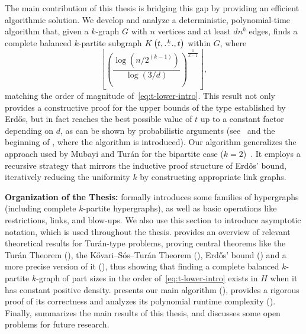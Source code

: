 The main contribution of this thesis is bridging this gap by providing an efficient algorithmic solution.
We develop and analyze a deterministic, polynomial-time algorithm that,
given a $k$-graph $G$ with $n$ vertices and at least $dn^k$ edges,
finds a complete balanced $k$-partite subgraph $K\left(t, \overset{k}{\dots}, t\right)$ within $G$, where
\[
    \left\lfloor \left(  \frac{\log \left(n/2^{(k-1)}\right)}{\log (3/d)} \right)^{\frac{1}{k-1}} \right\rfloor,
\]
matching the order of magnitude of~\eqref{eq:t-lower-intro}.
This result not only provides a constructive proof for the upper bounds of the type established by Erdős,
but in fact reaches the best possible value of $t$ up to a constant factor depending on $d$, as
can be shown by probabilistic arguments (see~ and
the beginning of , where the algorithm is introduced).
Our algorithm generalizes the approach used by Mubayi and Turán for the bipartite case ($k=2$)~\cite{MUBAYI2010174}.
It employs a recursive strategy that mirrors the inductive proof structure of Erdős' bound,
iteratively reducing the uniformity $k$ by constructing appropriate link graphs.

\textbf{Organization of the Thesis:}
 formally introduces some families of hypergraphs
(including complete $k$-partite hypergraphs),
as well as basic operations like restrictions, links, and blow-ups.
We also use this section to introduce asymptotic notation, which is used throughout the thesis.
 provides an overview of relevant theoretical results for Turán-type problems,
proving central theorems like the Turán Theorem (), the Kővari--Sós--Turán Theorem (),
Erdős' bound () and a more precise version of it (),
thus showing that finding a complete balanced $k$-partite $k$-graph of part sizes in the order of~\eqref{eq:t-lower-intro}
exists in $H$ when it has constant positive density.
 presents our main algorithm (),
provides a rigorous proof of its correctness and analyzes its polynomial runtime complexity ().
Finally,  summarizes the main results of this thesis, and discusses some open problems for future research.
